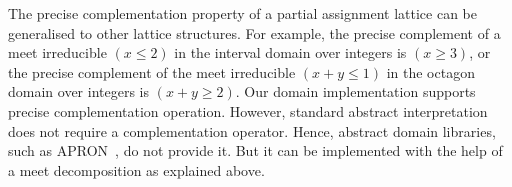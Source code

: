 %
%
The precise complementation property of a partial assignment lattice can
be generalised to other lattice structures. 
%
For example, the precise complement of a meet irreducible $(x \leq 2)$ in
the interval domain over integers is $(x \geq 3)$, or the precise complement
of the meet irreducible $(x+y \leq 1)$ in the octagon domain over integers
is $(x+y \geq 2)$.  Our domain implementation supports precise
complementation operation.  However, standard abstract interpretation does
not require a complementation operator.  Hence, abstract domain libraries,
such as APRON~\cite{apron}, do not provide it.  But it can be implemented
with the help of a meet decomposition as explained above.
%
% 
